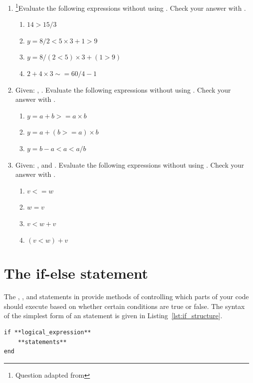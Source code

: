 \begin{enumerate}
\item \footnote[2]{Question adapted from \gilatbook}Evaluate the following expressions without using \mlab. Check your answer with \mlab.
\begin{enumerate}
\item $14 > 15 / 3$
\item $y = 8 / 2 < 5 \times 3 + 1 > 9$
\item $y = 8/(2 < 5) \times 3 + (1 > 9)$
\item $2 + 4 \times 3  \sim = 60 / 4 - 1$
\end{enumerate}

\item \footnotemark[2]Given: , . Evaluate the following expressions without using \mlab. Check your answer with \mlab.
\begin{enumerate}
\item $y = a + b  >= a\times b$
\item $y = a + (b  >= a) \times b$
\item $y = b - a < a < a/b$
\end{enumerate}

\item \footnotemark[2]Given: , and . Evaluate the following expressions without using \mlab. Check your answer with \mlab.
\begin{enumerate}
\item $v  <= w$
\item $w = v$
\item $v < w + v$
\item $(v < w) + v$
\end{enumerate}
\end{enumerate}

\section{The if-else statement}
The , , and  statements in \mlab provide methods of controlling which parts of your code should execute based on whether certain conditions are true or false. The syntax of the simplest form of an  statement is given in Listing~\ref{lst:if_structure}.
\begin{lstlisting}[caption={Syntax of an \mcode{if} statement},label=lst:if_structure]
if **logical_expression**
	**statements**
end
\end{lstlisting}

